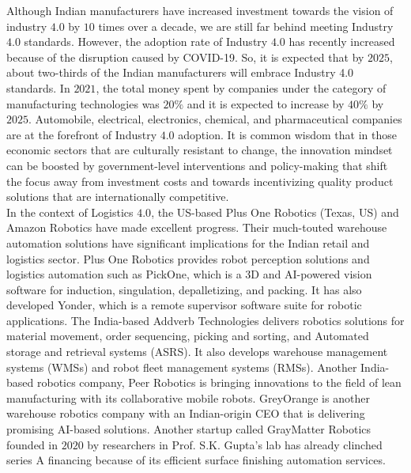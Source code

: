 \documentclass[paper=a4wide, fontsize=12pt]{scrartcl}
\begin{document}
Although Indian manufacturers have increased investment towards the vision of industry $4.0$ by $10$ times over a decade, we are still far behind meeting Industry $4.0$ standards. However, the adoption rate of Industry $4.0$ has recently increased because of the disruption caused by COVID-19. So, it is expected that by $2025$, about two-thirds of the Indian manufacturers will embrace Industry 4.0 standards. In $2021$, the total money spent by companies under the category of manufacturing technologies was $20\%$ and it is expected to increase by $40\%$ by $2025$. Automobile, electrical, electronics, chemical, and pharmaceutical companies are at the forefront of Industry $4.0$ adoption. It is common wisdom that in those economic sectors that are culturally resistant to change, the innovation mindset can be boosted by government-level interventions and policy-making that shift the focus away from investment costs and towards incentivizing quality product solutions that are internationally competitive\cite{nasscom}. \\

In the context of Logistics $4.0$, the US-based Plus One Robotics (Texas, US) and Amazon Robotics have made excellent progress. Their much-touted warehouse automation solutions have significant implications for the Indian retail and logistics sector. Plus One Robotics provides robot perception solutions and logistics automation such as PickOne, which is a 3D and AI-powered vision software for induction, singulation, depalletizing, and packing. It has also developed Yonder, which is a remote supervisor software suite for robotic applications. The India-based Addverb Technologies delivers robotics solutions for material movement, order sequencing, picking and sorting, and Automated storage and retrieval systems (ASRS). It also develops warehouse management systems (WMSs) and robot fleet management systems (RMSs). Another India-based robotics company, Peer Robotics is bringing innovations to the field of lean manufacturing with its collaborative mobile robots. GreyOrange is another warehouse robotics company with an Indian-origin CEO that is delivering promising AI-based solutions. Another startup called GrayMatter Robotics founded in $2020$ by researchers in Prof. S.K. Gupta's lab has already clinched series A financing because of its efficient surface finishing automation services. \\
\end{document}
